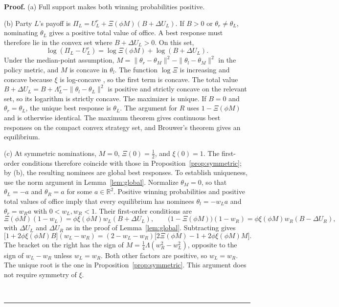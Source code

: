 \documentclass[12pt,letterpaper]{article}
\newenvironment{proof}[1][Proof]{\noindent\textbf{#1.} }{\ \rule{0.5em}{0.5em}}
\begin{document}
\begin{proof}
(a) Full support makes both winning probabilities positive.

(b) Party $L$'s payoff is $\Pi_L=U_L^r+\Xi(\phi M)(B+\Delta U_L)$. If $B>0$ or $\theta_r\ne\theta_L$, nominating $\theta_L$ gives a positive total value of office. A best response must therefore lie in the convex set where $B+\Delta U_L>0$. On this set,
\[
\log(\Pi_L-U_L^r)=\log \Xi(\phi M)+\log(B+\Delta U_L).
\]
Under the median-point assumption, $M=\|\theta_r-\theta_M\|^2-\|\theta_l-\theta_M\|^2$ in the policy metric, and $M$ is concave in $\theta_l$. The function $\log \Xi$ is increasing and concave because $\xi$ is log-concave \citep{BagnoliBergstrom2005}, so the first term is concave. The total value $B+\Delta U_L=B+\Lambda_L^r-\|\theta_l-\theta_L\|^2$ is positive and strictly concave on the relevant set, so its logarithm is strictly concave. The maximizer is unique. If $B=0$ and $\theta_r=\theta_L$, the unique best response is $\theta_L$. The argument for $R$ uses $1-\Xi(\phi M)$ and is otherwise identical. The maximum theorem \citep{Berge1963} gives continuous best responses on the compact convex strategy set, and Brouwer's theorem \citep{Border1985} gives an equilibrium.

(c) At symmetric nominations, $M=0$, $\Xi(0)=\tfrac12$, and $\xi(0)=1$. The first-order conditions therefore coincide with those in Proposition~\ref{prop:symmetric}; by (b), the resulting nominees are global best responses. To establish uniqueness, use the norm argument in Lemma~\ref{lem:global}. Normalize $\theta_M=0$, so that $\theta_L=-a$ and $\theta_R=a$ for some $a\in\mathbb{R}^2$. Positive winning probabilities and positive total values of office imply that every equilibrium has nominees $\theta_l=-w_La$ and $\theta_r=w_Ra$ with $0<w_L,w_R<1$. Their first-order conditions are
\[
\Xi(\phi M)(1-w_L)=\phi\xi(\phi M)w_L(B+\Delta U_L),\qquad
\big(1-\Xi(\phi M)\big)(1-w_R)=\phi\xi(\phi M)w_R(B-\Delta U_R),
\]
with $\Delta U_L$ and $\Delta U_R$ as in the proof of Lemma~\ref{lem:global}. Subtracting gives
\[
\big[1+2\phi\xi(\phi M)B\big](w_L-w_R)
=(2-w_L-w_R)\big[2\Xi(\phi M)-1+2\phi\xi(\phi M)M\big].
\]
The bracket on the right has the sign of $M=\tfrac14\Lambda(w_R^2-w_L^2)$, opposite to the sign of $w_L-w_R$ unless $w_L=w_R$. Both other factors are positive, so $w_L=w_R$. The unique root is the one in Proposition~\ref{prop:symmetric}. This argument does not require symmetry of $\xi$.


\end{proof}
\end{document}
